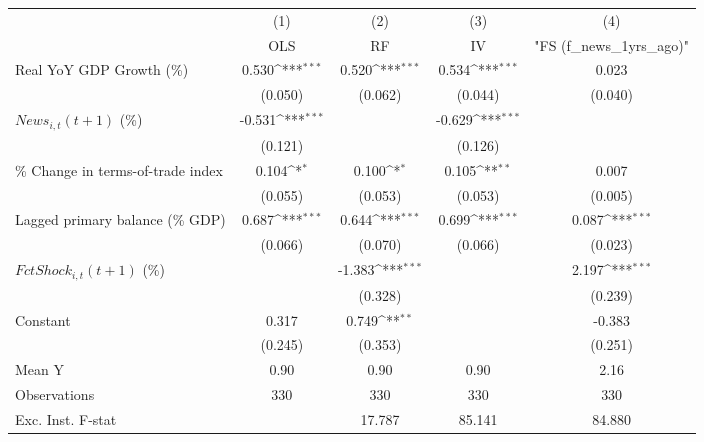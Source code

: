{
\def\sym#1{\ifmmode^{#1}\else\(^{#1}\)\fi}
\begin{tabular}{l*{4}{c}}
\toprule
                    &\multicolumn{1}{c}{(1)}&\multicolumn{1}{c}{(2)}&\multicolumn{1}{c}{(3)}&\multicolumn{1}{c}{(4)}\\
                    &\multicolumn{1}{c}{OLS}&\multicolumn{1}{c}{RF}&\multicolumn{1}{c}{IV}&\multicolumn{1}{c}{ "FS (f_news_1yrs_ago)" }\\
\midrule
Real YoY GDP Growth (\%)&       0.530\sym{***}&       0.520\sym{***}&       0.534\sym{***}&       0.023         \\
                    &     (0.050)         &     (0.062)         &     (0.044)         &     (0.040)         \\
\addlinespace
$ News_{i,t}(t+1)$ (\%)&      -0.531\sym{***}&                     &      -0.629\sym{***}&                     \\
                    &     (0.121)         &                     &     (0.126)         &                     \\
\addlinespace
\% Change in terms-of-trade index&       0.104\sym{*}  &       0.100\sym{*}  &       0.105\sym{**} &       0.007         \\
                    &     (0.055)         &     (0.053)         &     (0.053)         &     (0.005)         \\
\addlinespace
Lagged primary balance (\% GDP)&       0.687\sym{***}&       0.644\sym{***}&       0.699\sym{***}&       0.087\sym{***}\\
                    &     (0.066)         &     (0.070)         &     (0.066)         &     (0.023)         \\
\addlinespace
$ FctShock_{i,t}(t+1)$ (\%)&                     &      -1.383\sym{***}&                     &       2.197\sym{***}\\
                    &                     &     (0.328)         &                     &     (0.239)         \\
\addlinespace
Constant            &       0.317         &       0.749\sym{**} &                     &      -0.383         \\
                    &     (0.245)         &     (0.353)         &                     &     (0.251)         \\
\midrule
Mean Y              &        0.90         &        0.90         &        0.90         &        2.16         \\
Observations        &         330         &         330         &         330         &         330         \\
Exc. Inst. F-stat   &                     &      17.787         &      85.141         &      84.880         \\
\bottomrule
\end{tabular}
}
